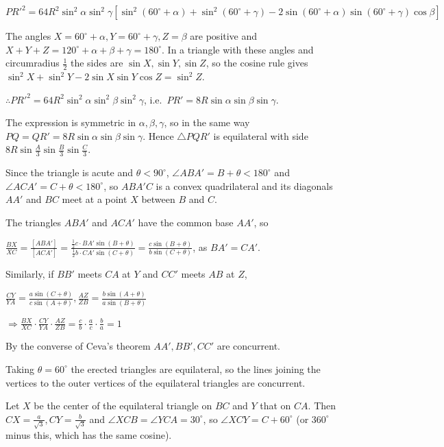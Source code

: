   $PR'^2 = 64R^2\sin^2\alpha\sin^2\gamma\left[\sin^2(60^\circ + \alpha) + \sin^2(60^\circ + \gamma) -
  2\sin(60^\circ + \alpha)\sin(60^\circ + \gamma)\cos\beta\right]$

  The angles $X = 60^\circ + \alpha, Y = 60^\circ + \gamma, Z = \beta$ are positive and $X + Y + Z =
  120^\circ + \alpha + \beta + \gamma = 180^\circ$. In a triangle with these angles and circumradius
  $\frac{1}{2}$ the sides are $\sin X, \sin Y, \sin Z$, so the cosine rule gives $\sin^2X + \sin^2Y - 2\sin
  X\sin Y\cos Z = \sin^2Z$.

  $\therefore PR'^2 = 64R^2\sin^2\alpha\sin^2\beta\sin^2\gamma$, i.e.\ $PR' =
  8R\sin\alpha\sin\beta\sin\gamma$.

  The expression is symmetric in $\alpha, \beta, \gamma$, so in the same way $PQ = QR' =
  8R\sin\alpha\sin\beta\sin\gamma$. Hence $\triangle PQR'$ is equilateral with side $8R\sin\frac{A}{3}\sin
  \frac{B}{3}\sin\frac{C}{3}$.
\item Since the triangle is acute and $\theta < 90^\circ$, $\angle ABA' = B + \theta < 180^\circ$ and $\angle
  ACA' = C + \theta < 180^\circ$, so $ABA'C$ is a convex quadrilateral and its diagonals $AA'$ and $BC$ meet
  at a point $X$ between $B$ and $C$.

  The triangles $ABA'$ and $ACA'$ have the common base $AA'$, so

  $\frac{BX}{XC} = \frac{[ABA']}{[ACA']} = \frac{\frac{1}{2}c\cdot BA'\sin(B + \theta)}{\frac{1}{2}b\cdot
  CA'\sin(C + \theta)} = \frac{c\sin(B + \theta)}{b\sin(C + \theta)}$, as $BA' = CA'$.

  Similarly, if $BB'$ meets $CA$ at $Y$ and $CC'$ meets $AB$ at $Z$,

  $\frac{CY}{YA} = \frac{a\sin(C + \theta)}{c\sin(A + \theta)}, \frac{AZ}{ZB} = \frac{b\sin(A + \theta)}{a\sin(B
  + \theta)}$

  $\Rightarrow \frac{BX}{XC}\cdot\frac{CY}{YA}\cdot\frac{AZ}{ZB} = \frac{c}{b}\cdot\frac{a}{c}\cdot\frac{b}{a} =
  1$

  By the converse of Ceva's theorem $AA', BB', CC'$ are concurrent.

  Taking $\theta = 60^\circ$ the erected triangles are equilateral, so the lines joining the vertices to the
  outer vertices of the equilateral triangles are concurrent.
\item Let $X$ be the center of the equilateral triangle on $BC$ and $Y$ that on $CA$. Then $CX =
  \frac{a}{\sqrt{3}}, CY = \frac{b}{\sqrt{3}}$ and $\angle XCB = \angle YCA = 30^\circ$, so $\angle XCY = C +
  60^\circ$ (or $360^\circ$ minus this, which has the same cosine).

